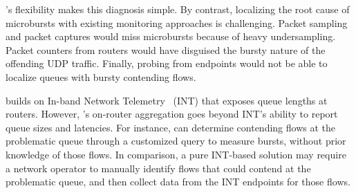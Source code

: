 \TheSystem's flexibility makes this diagnosis simple.  By contrast, localizing
the root cause of microbursts with existing monitoring approaches is
challenging.  Packet sampling and packet captures would miss microbursts
because of heavy undersampling. Packet counters from routers would have
disguised the bursty nature of the offending UDP traffic. Finally, probing from
endpoints would not be able to localize queues with bursty contending flows.

\TheSystem builds on In-band Network Telemetry~\cite{int, barefoot-demo} (INT)
that exposes queue lengths at routers. However, \TheSystem's on-router
aggregation goes beyond INT's ability to report queue sizes and latencies. For
instance, \TheSystem can determine contending flows at the problematic queue
through a customized query to measure bursts, without prior knowledge of those
flows. In comparison, a pure INT-based solution may require a network operator
to manually identify flows that could contend at the problematic queue, and
then collect data from the INT endpoints for those flows.

